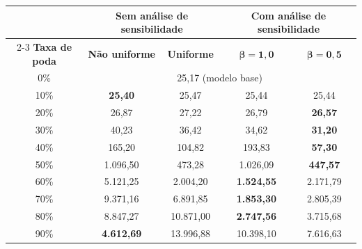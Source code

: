 \begin{tabular}{c cc cc}
\hline
& \multicolumn{2}{c}{\textbf{Sem análise de sensibilidade}} & \multicolumn{2}{c}{\textbf{Com análise de sensibilidade}} \\
\cline{2-3} \cline{4-5}
\textbf{Taxa de poda} & \textbf{Não uniforme} & \textbf{Uniforme} & $\boldsymbol{\beta = 1{,}0}$ & $\boldsymbol{\beta = 0{,}5}$ \\
\hline
0\% & \multicolumn{4}{c}{25,17 (modelo base)} \\
10\% & \textbf{25,40} & 25,47 & 25,44 & 25,44 \\
20\% & 26,87 & 27,22 & 26,79 & \textbf{26,57} \\
30\% & 40,23 & 36,42 & 34,62 & \textbf{31,20} \\
40\% & 165,20 & 104,82 & 193,83 & \textbf{57,30} \\
50\% & 1.096,50 & 473,28 & 1.026,09 & \textbf{447,57} \\
60\% & 5.121,25 & 2.004,20 & \textbf{1.524,55} & 2.171,79 \\
70\% & 9.371,16 & 6.891,85 & \textbf{1.853,30} & 2.805,39 \\
80\% & 8.847,27 & 10.871,00 & \textbf{2.747,56} & 3.715,68 \\
90\% & \textbf{4.612,69} & 13.996,88 & 10.398,10 & 7.616,63 \\
\hline
\end{tabular}
